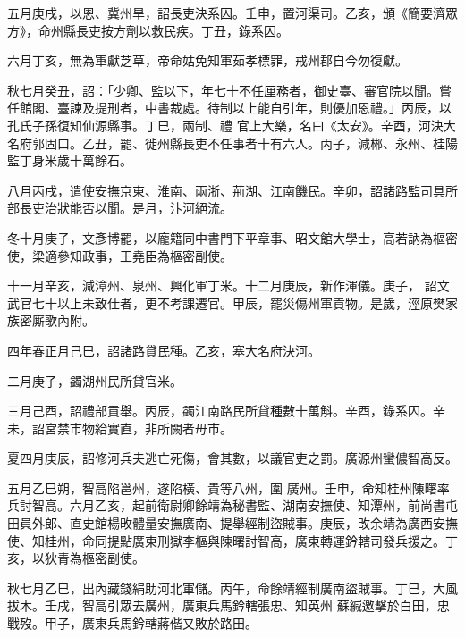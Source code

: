\begin{pinyinscope}
 五月庚戌，以恩、冀州旱，詔長吏決系囚。壬申，置河渠司。乙亥，頒《簡要濟眾方》，命州縣長吏按方劑以救民疾。丁丑，錄系囚。



 六月丁亥，無為軍獻芝草，帝命姑免知軍茹孝標罪，戒州郡自今勿復獻。



 秋七月癸丑，詔：「少卿、監以下，年七十不任厘務者，御史臺、審官院以聞。嘗任館閣、臺諫及提刑者，中書裁處。待制以上能自引年，則優加恩禮。」丙辰，以孔氏子孫復知仙源縣事。丁巳，兩制、禮
 官上大樂，名曰《太安》。辛酉，河決大名府郭固口。乙丑，罷、徙州縣長吏不任事者十有六人。丙子，減郴、永州、桂陽監丁身米歲十萬餘石。



 八月丙戌，遣使安撫京東、淮南、兩浙、荊湖、江南饑民。辛卯，詔諸路監司具所部長吏治狀能否以聞。是月，汴河絕流。



 冬十月庚子，文彥博罷，以龐籍同中書門下平章事、昭文館大學士，高若訥為樞密使，梁適參知政事，王堯臣為樞密副使。



 十一月辛亥，減漳州、泉州、興化軍丁米。十二月庚辰，新作渾儀。庚子，
 詔文武官七十以上未致仕者，更不考課遷官。甲辰，罷災傷州軍貢物。是歲，涇原樊家族密廝歌內附。



 四年春正月己巳，詔諸路貸民種。乙亥，塞大名府決河。



 二月庚子，蠲湖州民所貸官米。



 三月己酉，詔禮部貢舉。丙辰，蠲江南路民所貸種數十萬斛。辛酉，錄系囚。辛未，詔宮禁市物給實直，非所闕者毋市。



 夏四月庚辰，詔修河兵夫逃亡死傷，會其數，以議官吏之罰。廣源州蠻儂智高反。



 五月乙巳朔，智高陷邕州，遂陷橫、貴等八州，圍
 廣州。壬申，命知桂州陳曙率兵討智高。六月乙亥，起前衛尉卿餘靖為秘書監、湖南安撫使、知潭州，前尚書屯田員外郎、直史館楊畋體量安撫廣南、提舉經制盜賊事。庚辰，改余靖為廣西安撫使、知桂州，命同提點廣東刑獄李樞與陳曙討智高，廣東轉運鈐轄司發兵援之。丁亥，以狄青為樞密副使。



 秋七月乙巳，出內藏錢絹助河北軍儲。丙午，命餘靖經制廣南盜賊事。丁巳，大風拔木。壬戌，智高引眾去廣州，廣東兵馬鈐轄張忠、知英州
 蘇緘邀擊於白田，忠戰歿。甲子，廣東兵馬鈐轄蔣偕又敗於路田。




\end{pinyinscope}
